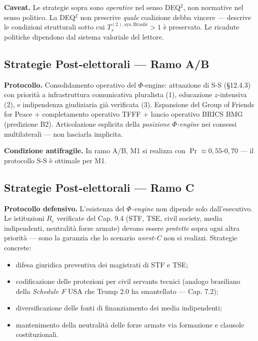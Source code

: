 \Conj{} \textbf{Caveat.} Le strategie sopra sono \emph{operative} nel
senso DEQ$^2$, non normative nel senso politico. La DEQ$^2$ non prescrive
\emph{quale} coalizione debba vincere --- descrive le condizioni
strutturali sotto cui \(T_s^{(2),\text{sys},\text{Brasile}} > 1\) è
preservato. Le ricadute politiche dipendono dal sistema valoriale del
lettore.

\subsection{Strategie Post-elettorali --- Ramo
A/B}\label{strategie-post-elettorali-ramo-ab}

\Hypoth{} \textbf{Protocollo.} Consolidamento operativo del
\(\Phi\)-engine: attuazione di S-S (\S{}12.4.3) con priorità a
infrastruttura comunicativa pluralista (1), educazione \(z\)-intensiva
(2), e indipendenza giudiziaria già verificata (3). Espansione del Group
of Friends for Peace + completamento operativo TFFF + lancio operativo
BRICS BMG (predizione B2). Articolazione esplicita della \emph{posizione
\(\Phi\)-engine} nei consessi multilaterali --- non lasciarla implicita.

\Proved{} \textbf{Condizione antifragile.} In ramo A/B, M1 si realizza
con \(\Pr \approx 0{,}55\)-\(0{,}70\) --- il protocollo S-S è ottimale
per M1.

\subsection{Strategie Post-elettorali --- Ramo
C}\label{strategie-post-elettorali-ramo-c}

\Hypoth{} \textbf{Protocollo defensivo.} L'esistenza del \emph{$\Phi$-engine}
non dipende solo dall'esecutivo. Le istituzioni \(R_c\) verificate del
Cap. 9.4 (STF, TSE, civil society, media indipendenti, neutralità forze
armate) devono essere \emph{protette} sopra ogni altra priorità --- sono
la garanzia che lo scenario \emph{worst-C} non si realizzi. Strategie
concrete:

\begin{itemize}
\tightlist
\item
  difesa giuridica preventiva dei magistrati di STF e TSE;
\item
  codificazione delle protezioni per civil servants tecnici (analogo
  brasiliano della \emph{Schedule F} USA che Trump 2.0 ha smantellato
  --- Cap. 7.2);
\item
  diversificazione delle fonti di finanziamento dei media indipendenti;
\item
  mantenimento della neutralità delle forze armate via formazione e
  clausole costituzionali.
\end{itemize}


